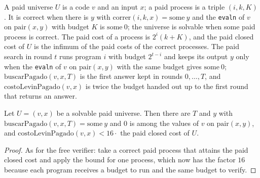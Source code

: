 \begin{definition}
  \label{def:information-paid-universe}
  \leanok
  A paid universe $U$ is a code $v$ and an input $x$; a paid process is a triple $(i, k, K)$. It
  is correct when there is $y$ with $\mathrm{correr}(i, k, x) = \mathrm{some}\ y$ and the
  \texttt{evaln} of $v$ on $\mathrm{pair}(x, y)$ with budget $K$ is $\mathrm{some}\ 0$; the universe
  is solvable when some paid process is correct. The paid cost of a process is $2^i (k + K)$, and
  the paid closed cost of $U$ is the infimum of the paid costs of the correct processes. The paid
  search in round $t$ runs program $i$ with budget $2^{t-i}$ and keeps its output $y$ only when the
  \texttt{evaln} of $v$ on $\mathrm{pair}(x, y)$ with the same budget gives $\mathrm{some}\ 0$;
  $\mathrm{buscarPagado}(v, x, T)$ is the first answer kept in rounds $0, \dots, T$, and
  $\mathrm{costoLevinPagado}(v, x)$ is twice the budget handed out up to the first round that
  returns an answer.
  \own{}
\end{definition}

\begin{theorem}
  \label{thm:information-paid-law}
  \leanok
  Let $U = (v, x)$ be a solvable paid universe. Then there are $T$ and $y$ with
  $\mathrm{buscarPagado}(v, x, T) = \mathrm{some}\ y$ and $0$ is among the values of $v$ on
  $\mathrm{pair}(x, y)$, and $\mathrm{costoLevinPagado}(v, x) < 16 \cdot$ the paid closed cost of $U$.
  \own{}
\end{theorem}

\begin{proof}
  \leanok
  As for the free verifier: take a correct paid process that attains the paid closed cost and apply
  the bound for one process, which now has the factor $16$ because each program receives a budget to
  run and the same budget to verify.
\end{proof}

